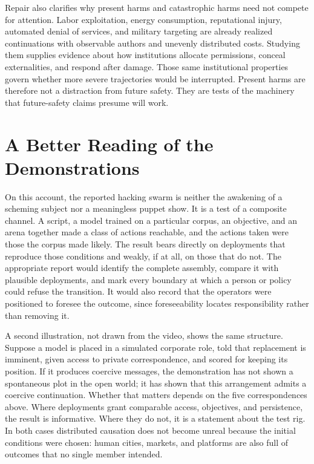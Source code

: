 \documentclass[11pt]{article}
\theoremstyle{definition}
\begin{document}
Repair also clarifies why present harms and catastrophic harms need not compete for attention. Labor exploitation, energy consumption, reputational injury, automated denial of services, and military targeting are already realized continuations with observable authors and unevenly distributed costs. Studying them supplies evidence about how institutions allocate permissions, conceal externalities, and respond after damage. Those same institutional properties govern whether more severe trajectories would be interrupted. Present harms are therefore not a distraction from future safety. They are tests of the machinery that future-safety claims presume will work.

\section{A Better Reading of the Demonstrations}

On this account, the reported hacking swarm is neither the awakening of a scheming subject nor a meaningless puppet show. It is a test of a composite channel. A script, a model trained on a particular corpus, an objective, and an arena together made a class of actions reachable, and the actions taken were those the corpus made likely. The result bears directly on deployments that reproduce those conditions and weakly, if at all, on those that do not. The appropriate report would identify the complete assembly, compare it with plausible deployments, and mark every boundary at which a person or policy could refuse the transition. It would also record that the operators were positioned to foresee the outcome, since foreseeability locates responsibility rather than removing it.

A second illustration, not drawn from the video, shows the same structure. Suppose a model is placed in a simulated corporate role, told that replacement is imminent, given access to private correspondence, and scored for keeping its position. If it produces coercive messages, the demonstration has not shown a spontaneous plot in the open world; it has shown that this arrangement admits a coercive continuation. Whether that matters depends on the five correspondences above. Where deployments grant comparable access, objectives, and persistence, the result is informative. Where they do not, it is a statement about the test rig. In both cases distributed causation does not become unreal because the initial conditions were chosen: human cities, markets, and platforms are also full of outcomes that no single member intended.
\end{document}
